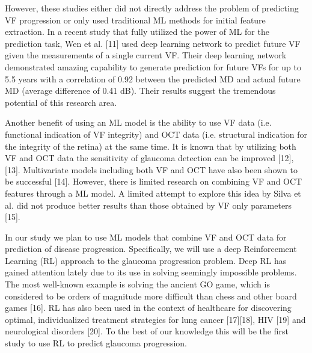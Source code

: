 However, these studies either did not directly address the problem of predicting VF progression or only used traditional ML methods for initial feature extraction. In a recent study that fully utilized the power of ML for the prediction task, Wen et al. [11] used deep learning network to predict future VF given the measurements of a single current VF. Their deep learning network demonstrated amazing capability to generate prediction for future VFs for up to 5.5 years with a correlation of 0.92 between the predicted MD and actual future MD (average difference of 0.41 dB). Their results suggest the tremendous potential of this research area. 

Another benefit of using an ML model is the ability to use VF data (i.e. functional indication of VF integrity) and OCT data (i.e. structural indication for the integrity of the retina) at the same time. It is known that by utilizing both VF and OCT data the sensitivity of glaucoma detection can be improved [12], [13]. Multivariate models including both VF and OCT have also been shown to be successful [14]. However, there is limited research on combining VF and OCT features through a ML model. A limited attempt to explore this idea by Silva et al. did not produce better results than those obtained by VF only parameters [15]. 

In our study we plan to use ML models that combine VF and OCT data for prediction of disease progression.  Specifically, we will use a deep Reinforcement Learning (RL) approach to the glaucoma progression problem. Deep RL has gained attention lately due to its use in solving seemingly impossible problems. The most well-known example is solving the ancient GO game, which is considered to be orders of magnitude more difficult than chess and other board games [16]. RL has also been used in the context of healthcare for discovering optimal, individualized treatment strategies for lung cancer [17][18], HIV [19] and neurological disorders [20]. To the best of our knowledge this will be the first study to use RL to predict glaucoma progression. 

